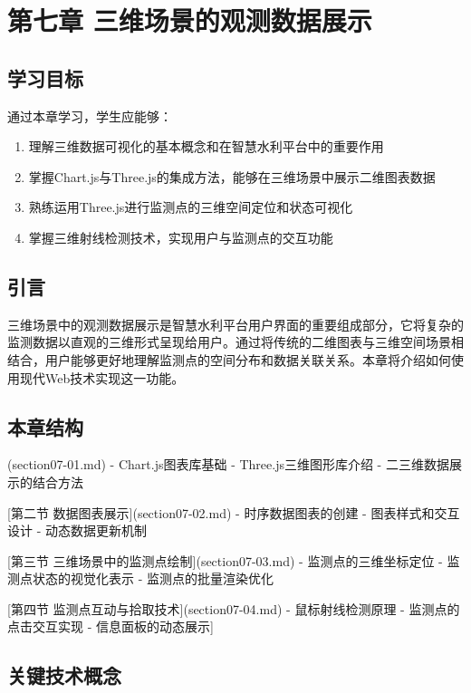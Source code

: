 \chapter{第七章 三维场景的观测数据展示}

\section{学习目标}

通过本章学习，学生应能够：

\begin{enumerate}
\def\labelenumi{\arabic{enumi}.}
\tightlist
\item
  理解三维数据可视化的基本概念和在智慧水利平台中的重要作用
\item
  掌握Chart.js与Three.js的集成方法，能够在三维场景中展示二维图表数据
\item
  熟练运用Three.js进行监测点的三维空间定位和状态可视化
\item
  掌握三维射线检测技术，实现用户与监测点的交互功能
\end{enumerate}

\section{引言}

三维场景中的观测数据展示是智慧水利平台用户界面的重要组成部分，它将复杂的监测数据以直观的三维形式呈现给用户。通过将传统的二维图表与三维空间场景相结合，用户能够更好地理解监测点的空间分布和数据关联关系。本章将介绍如何使用现代Web技术实现这一功能。

\section{本章结构}

\begin{tcolorbox}[colback=cyan!5!white,colframe=cyan!75!black,title=Info 章节安排
    
     [第一节 数据类型与展示方式](section07-01.md)
    - Chart.js图表库基础
    - Three.js三维图形库介绍
    - 二三维数据展示的结合方法
    
     [第二节 数据图表展示](section07-02.md)
    - 时序数据图表的创建
    - 图表样式和交互设计
    - 动态数据更新机制
    
     [第三节 三维场景中的监测点绘制](section07-03.md)
    - 监测点的三维坐标定位
    - 监测点状态的视觉化表示
    - 监测点的批量渲染优化
    
     [第四节 监测点互动与拾取技术](section07-04.md)
    - 鼠标射线检测原理
    - 监测点的点击交互实现
    - 信息面板的动态展示]
\section{关键技术概念}

\end{tcolorbox}

